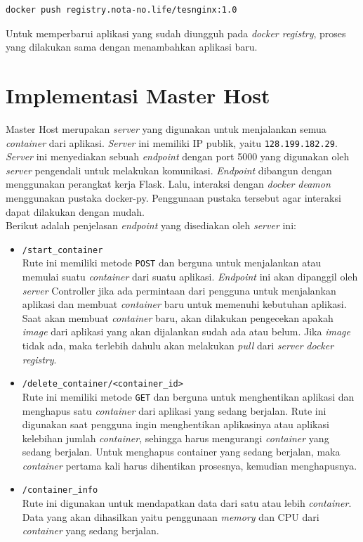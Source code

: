 \begin{lstlisting}[frame=single,tabsize=2,breaklines,caption={Perintah \textit{Push Image} Terbaru Nginx},label=pushnginx, captionpos=b]
docker push registry.nota-no.life/tesnginx:1.0
\end{lstlisting}
            \indent Untuk memperbarui aplikasi yang sudah diungguh pada \textit{docker registry}, proses yang dilakukan sama dengan menambahkan aplikasi baru.
    
    \section{Implementasi Master Host}
    	Master Host merupakan \textit{server} yang digunakan untuk menjalankan semua \textit{container} dari aplikasi. \textit{Server} ini memiliki IP publik, yaitu \texttt{128.199.182.29}. \textit{Server} ini menyediakan sebuah \textit{endpoint} dengan port 5000 yang digunakan oleh \textit{server} pengendali untuk melakukan komunikasi. \textit{Endpoint} dibangun dengan menggunakan perangkat kerja Flask. Lalu, interaksi dengan \textit{docker deamon} menggunakan pustaka docker-py. Penggunaan pustaka tersebut agar interaksi dapat dilakukan dengan mudah. \\
        \indent Berikut adalah penjelasan \textit{endpoint} yang disediakan oleh \textit{server} ini:
        \begin{itemize}
        \item \texttt{/start\_container} \\
        	Rute ini memiliki metode \texttt{POST} dan berguna untuk menjalankan atau memulai suatu \textit{container} dari suatu aplikasi. \textit{Endpoint} ini akan dipanggil oleh \textit{server} Controller jika ada permintaan dari pengguna untuk menjalankan aplikasi dan membuat \textit{container} baru untuk memenuhi kebutuhan aplikasi. Saat akan membuat \textit{container} baru, akan dilakukan pengecekan apakah \textit{image} dari aplikasi yang akan dijalankan sudah ada atau belum. Jika \textit{image} tidak ada, maka terlebih dahulu akan melakukan \textit{pull} dari \textit{server} \textit{docker registry}. \\
        \item \texttt{/delete\_container/<container\_id>} \\
        	Rute ini memiliki metode \texttt{GET} dan berguna untuk menghentikan aplikasi dan menghapus satu \textit{container} dari aplikasi yang sedang berjalan. Rute ini digunakan saat pengguna ingin menghentikan aplikasinya atau aplikasi kelebihan jumlah \textit{container}, sehingga harus mengurangi \textit{container} yang sedang berjalan. Untuk menghapus container yang sedang berjalan, maka \textit{container} pertama kali harus dihentikan prosesnya, kemudian menghapusnya. \\
        \item \texttt{/container\_info} \\
        	Rute ini digunakan untuk mendapatkan data dari satu atau lebih \textit{container}. Data yang akan dihasilkan yaitu penggunaan\textit{ memory} dan CPU dari \textit{container} yang sedang berjalan. \\
        \end{itemize}
    
